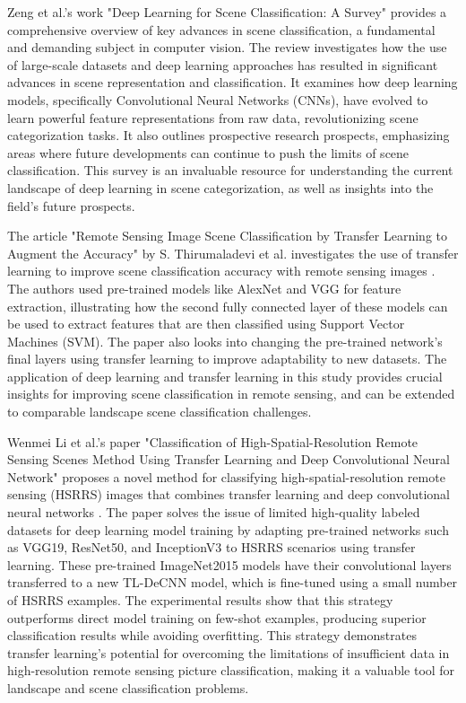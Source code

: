 \documentclass[conference]{IEEEtran}
\begin{document}
Zeng et al.'s \cite{zeng} work "Deep Learning for Scene Classification: A Survey" provides a comprehensive overview of key advances in scene classification, a fundamental and demanding subject in computer vision. The review investigates how the use of large-scale datasets and deep learning approaches has resulted in significant advances in scene representation and classification. It examines how deep learning models, specifically Convolutional Neural Networks (CNNs), have evolved to learn powerful feature representations from raw data, revolutionizing scene categorization tasks. It also outlines prospective research prospects, emphasizing areas where future developments can continue to push the limits of scene classification. This survey is an invaluable resource for understanding the current landscape of deep learning in scene categorization, as well as insights into the field's future prospects.

The article "Remote Sensing Image Scene Classification by Transfer Learning to Augment the Accuracy" by S. Thirumaladevi et al. investigates the use of transfer learning to improve scene classification accuracy with remote sensing images \cite{Thirumaladevi}. The authors used pre-trained models like AlexNet and VGG for feature extraction, illustrating how the second fully connected layer of these models can be used to extract features that are then classified using Support Vector Machines (SVM). The paper also looks into changing the pre-trained network's final layers using transfer learning to improve adaptability to new datasets. The application of deep learning and transfer learning in this study provides crucial insights for improving scene classification in remote sensing, and can be extended to comparable landscape scene classification challenges.

Wenmei Li et al.'s paper "Classification of High-Spatial-Resolution Remote Sensing Scenes Method Using Transfer Learning and Deep Convolutional Neural Network" proposes a novel method for classifying high-spatial-resolution remote sensing (HSRRS) images that combines transfer learning and deep convolutional neural networks \cite{Li}. The paper solves the issue of limited high-quality labeled datasets for deep learning model training by adapting pre-trained networks such as VGG19, ResNet50, and InceptionV3 to HSRRS scenarios using transfer learning. These pre-trained ImageNet2015 models have their convolutional layers transferred to a new TL-DeCNN model, which is fine-tuned using a small number of HSRRS examples. The experimental results show that this strategy outperforms direct model training on few-shot examples, producing superior classification results while avoiding overfitting. This strategy demonstrates transfer learning's potential for overcoming the limitations of insufficient data in high-resolution remote sensing picture classification, making it a valuable tool for landscape and scene classification problems.
\end{document}
